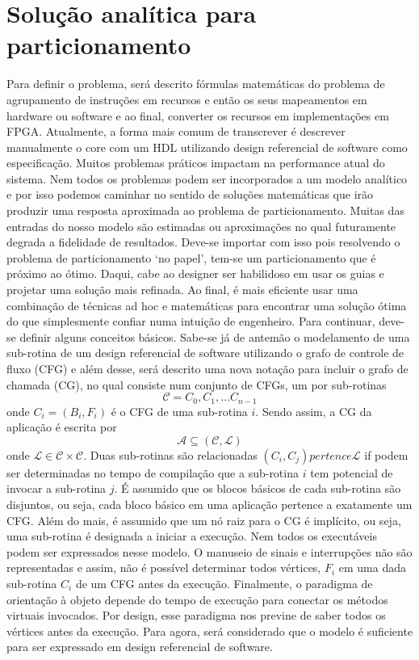 \section{Solução analítica para particionamento}
Para definir o problema, será descrito fórmulas matemáticas do problema de agrupamento de instruções em recursos e então os seus mapeamentos em hardware ou software e ao final, converter os recursos em implementações em FPGA. Atualmente, a forma mais comum de transcrever é descrever manualmente o core com um HDL utilizando design referencial de software como especificação.
Muitos problemas práticos impactam na performance atual do sistema. Nem todos os problemas podem ser incorporados a um modelo analítico e por isso podemos caminhar no sentido de soluções matemáticas que irão produzir uma resposta aproximada ao problema de particionamento. Muitas das entradas do nosso modelo são estimadas ou aproximações no qual futuramente degrada a fidelidade de resultados. Deve-se importar com isso pois resolvendo o problema de particionamento `no papel’, tem-se um particionamento que é próximo ao ótimo. Daqui, cabe ao designer ser habilidoso em usar os guias e projetar uma solução mais refinada. Ao final, é mais eficiente usar uma combinação de técnicas ad hoc e matemáticas para encontrar uma solução ótima do que simplesmente confiar numa intuição de engenheiro.
Para continuar, deve-se definir alguns conceitos básicos. Sabe-se já de antemão o modelamento de uma sub-rotina de um design referencial de software utilizando o grafo de controle de fluxo (CFG) e além desse, será descrito uma nova notação para incluir o grafo de chamada (CG), no qual consiste num conjunto de CFGs, um por sub-rotinas 
$$ \mathcal{C} = {C_0, C_1, \dots C_{n-1}} $$ 
onde $ C_i = (B_i, F_i) $ é o CFG de uma sub-rotina $ i $. Sendo assim, a CG da aplicação é escrita por 
$$ \mathcal{A} \subseteq (\mathcal{C}, \mathcal{L}) $$ 
onde $ \mathcal{L} \in \mathcal{C} \times \mathcal{C} $. Duas sub-rotinas são relacionadas $ (C_i, C_j) pertence \mathcal{L} $ if podem ser determinadas no tempo de compilação que a sub-rotina $ i $ tem potencial de invocar a sub-rotina $ j $.
É assumido que os blocos básicos de cada sub-rotina são disjuntos, ou seja, cada bloco básico em uma aplicação pertence a exatamente um CFG. Além do mais, é assumido que um nó raiz para o CG é implícito, ou seja, uma sub-rotina é designada a iniciar a execução. Nem todos os executáveis podem ser expressados nesse modelo. O manuseio de sinais e interrupções não são representadas e assim, não é possível determinar todos vértices, $ F_i $ em uma dada sub-rotina $ C_i $ de um CFG antes da execução. Finalmente, o paradigma de orientação à objeto depende do tempo de execução para conectar os métodos virtuais invocados. Por design, esse paradigma nos previne de saber todos os vértices antes da execução. Para agora, será considerado que o modelo é suficiente para ser expressado em design referencial de software. 
